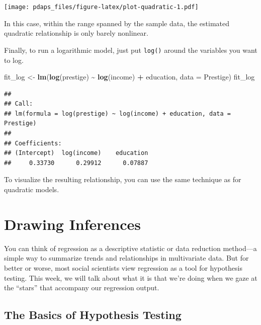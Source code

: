 \documentclass[
  12pt,
  oneside,openany]{book}
\newenvironment{Shaded}{\begin{snugshade}}{\end{snugshade}}
\newcommand{\DataTypeTok}[1]{\textcolor[rgb]{0.13,0.29,0.53}{#1}}
\newcommand{\KeywordTok}[1]{\textcolor[rgb]{0.13,0.29,0.53}{\textbf{#1}}}
\newcommand{\NormalTok}[1]{#1}
\newcommand{\OperatorTok}[1]{\textcolor[rgb]{0.81,0.36,0.00}{\textbf{#1}}}
\newcommand{\StringTok}[1]{\textcolor[rgb]{0.31,0.60,0.02}{#1}}
\begin{document}
\texttt{[image: pdaps\_files/figure-latex/plot-quadratic-1.pdf]}

In this case, within the range spanned by the sample data, the estimated quadratic relationship is only barely nonlinear.

Finally, to run a logarithmic model, just put \texttt{log()} around the variables you want to log.

\begin{Shaded}
\begin{Highlighting}[]
\NormalTok{fit\_log \textless{}{-}}\StringTok{ }\KeywordTok{lm}\NormalTok{(}\KeywordTok{log}\NormalTok{(prestige) }\OperatorTok{\textasciitilde{}}\StringTok{ }\KeywordTok{log}\NormalTok{(income) }\OperatorTok{+}\StringTok{ }\NormalTok{education, }\DataTypeTok{data =}\NormalTok{ Prestige)}
\NormalTok{fit\_log}
\end{Highlighting}
\end{Shaded}

\begin{verbatim}
## 
## Call:
## lm(formula = log(prestige) ~ log(income) + education, data = Prestige)
## 
## Coefficients:
## (Intercept)  log(income)    education  
##     0.33730      0.29912      0.07887
\end{verbatim}

To visualize the resulting relationship, you can use the same technique as for quadratic models.

\hypertarget{inference}{%
\chapter{Drawing Inferences}\label{inference}}

\providecommand{\Cov}{}
\renewcommand{\Cov}{\mathop{\rm Cov}\nolimits}
\providecommand{\SE}{}
\renewcommand{\SE}{\mathop{\rm SE}\nolimits}
\providecommand{\CI}{}
\renewcommand{\CI}{\mathop{\rm CI}\nolimits}

You can think of regression as a descriptive statistic or data reduction method---a simple way to summarize trends and relationships in multivariate data. But for better or worse, most social scientists view regression as a tool for hypothesis testing. This week, we will talk about what it is that we're doing when we gaze at the ``stars'' that accompany our regression output.

\hypertarget{the-basics-of-hypothesis-testing}{%
\section{The Basics of Hypothesis Testing}\label{the-basics-of-hypothesis-testing}}
\end{document}
